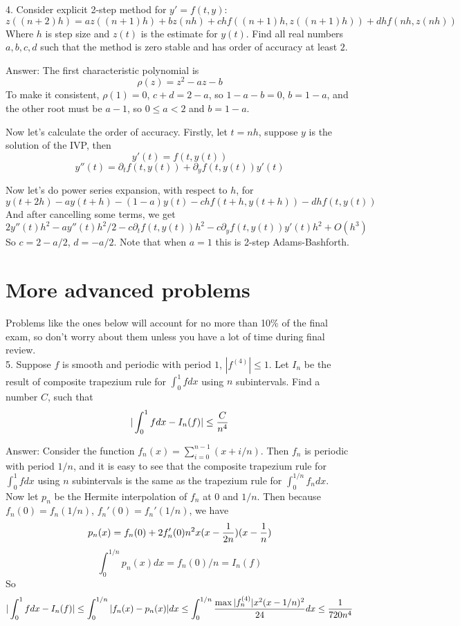 \documentclass[20pt]{article} %
\theoremstyle{break}
\begin{document}
4. Consider explicit 2-step method for $y'=f(t, y)$:
\[z((n+2)h)=az((n+1)h)+bz(nh)+chf((n+1)h, z((n+1)h))+dhf(nh, z(nh))\]
Where $h$ is step size and $z(t)$ is the estimate for $y(t)$. Find all real numbers $a, b, c, d$ such that the method is zero stable and has order of accuracy at least $2$.

Answer: The first characteristic polynomial is
\[\rho(z)=z^2-az-b\]
To make it consistent, $\rho(1)=0$, $c+d=2-a$, so $1-a-b=0$, $b=1-a$, and the other root must be $a-1$, so $0\leq a<2$ and $b=1-a$.

Now let's calculate the order of accuracy. Firstly, let $t=nh$, suppose $y$ is the solution of the IVP, then
\[y'(t)=f(t, y(t))\]
\[y''(t)=\partial_tf(t, y(t))+\partial_yf(t, y(t))y'(t)\]

Now let's do power series expansion, with respect to $h$, for
\[y(t+2h)-ay(t+h)-(1-a)y(t)-chf(t+h, y(t+h))-dhf(t, y(t))\]
And after cancelling some terms, we get
\[2y''(t)h^2-ay''(t)h^2/2-c\partial_t f(t, y(t))h^2-c\partial_y f(t, y(t))y'(t)h^2+O(h^3)\]
So $c=2-a/2$, $d=-a/2$. Note that when $a=1$ this is 2-step Adams-Bashforth.\\


\section{More advanced problems}

Problems like the ones below will account for no more than 10\% of the final exam, so don't worry about them unless you have a lot of time during final review.\\

5. Suppose $f$ is smooth and periodic with period $1$, $|f^{(4)}|\leq 1$. Let $I_n$ be the result of composite trapezium rule for $\int_0^1fdx$ using $n$ subintervals. Find a number $C$, such that
\[|\int_0^1fdx-I_n(f)|\leq {C\over n^4}\]

Answer: Consider the function $f_n(x)=\sum_{i=0}^{n-1}(x+i/n)$. Then $f_n$ is periodic with period $1/n$, and it is easy to see that the composite trapezium rule for $\int_0^1fdx$ using $n$ subintervals is the same as the trapezium rule for $\int_0^{1/n}f_ndx$.\\

Now let $p_n$ be the Hermite interpolation of $f_n$ at $0$ and $1/n$. Then because $f_n(0)=f_n(1/n)$, $f_n'(0)=f_n'(1/n)$, we have
\[p_n(x)=f_n(0)+2f'_n(0)n^2x(x-{1\over 2n})(x-{1\over n})\]
\[\int_0^{1/n}p_n(x)dx=f_n(0)/n=I_n(f)\]
So
\[|\int_0^1fdx-I_n(f)|\leq \int_0^{1/n}|f_n(x)-p_n(x)|dx\leq \int_0^{1/n}{\max|f_n^{(4)}|x^2(x-1/n)^2\over 24}dx\leq {1\over 720n^4}\]
\end{document}
